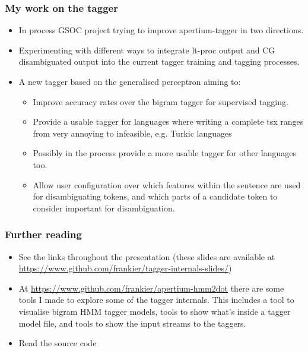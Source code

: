 \documentclass{beamer}
\begin{document}
\begin{frame}
\frametitle{My work on the tagger}
\begin{itemize}

  \item In process GSOC project trying to improve apertium-tagger in two
    directions.

  \item Experimenting with different ways to integrate lt-proc output and CG
    disambiguated output into the current tagger training and tagging
    processes.

  \item A new tagger based on the generalised perceptron aiming to:
    \begin{itemize}
      \item Improve accuracy rates over the bigram tagger for supervised
        tagging.
      \item Provide a usable tagger for languages where writing a complete tsx
        ranges from very annoying to infeasible, e.g. Turkic languages
      \item Possibly in the process provide a more usable tagger for other languages too.
      \item Allow user configuration over which features within the sentence
        are used for disambiguating tokens, and which parts of a candidate token to
        consider important for disambiguation.
    \end{itemize}

\end{itemize}
\end{frame}

\begin{frame}
\frametitle{Further reading}
\begin{itemize}

  \item See the links throughout the presentation (these slides are available
    at \url{https://www.github.com/frankier/tagger-internals-slides/})

  \item At \url{https://www.github.com/frankier/apertium-hmm2dot} there are
    some tools I made to explore some of the tagger internals. This includes a
    tool to visualise bigram HMM tagger models, tools to show what's inside a
    tagger model file, and tools to show the input streams to the taggers.

  \item Read the source code

\end{itemize}
\end{frame}
\end{document}
